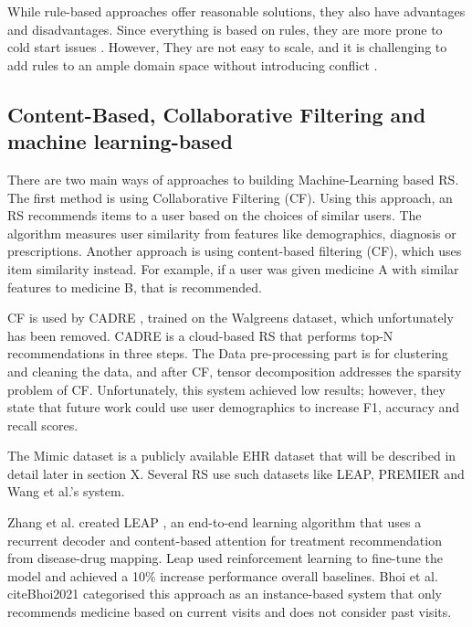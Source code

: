 While rule-based approaches offer reasonable solutions, they also have
advantages and disadvantages. Since everything is based on rules, they are
more prone to cold start issues \cite{PradeepKumarSingh2021}. However, They are
not easy to scale, and it is challenging to add rules to an ample domain space
without introducing conflict \cite{Bhoi2021}.

\subsection{
Content-Based, Collaborative Filtering and machine learning-based
}

There are two main ways of approaches to building Machine-Learning based
RS. The first method is using Collaborative Filtering (CF). Using this
approach, an RS recommends items to a user based on the choices of similar
users. The algorithm measures user similarity from features like
demographics, diagnosis or prescriptions. Another approach is using
content-based filtering (CF), which uses item similarity instead. For
example, if a user was given medicine A with similar features to medicine
B, that is recommended. 


CF is used by CADRE \cite{Zhang2015}, trained on the Walgreens dataset, which unfortunately
has been removed. CADRE is a cloud-based RS that performs top-N
recommendations in three steps. The Data pre-processing part is for
clustering and cleaning the data, and after CF, tensor decomposition
addresses the sparsity problem of CF. Unfortunately, this system achieved
low results; however, they state that future work could use user
demographics to increase F1, accuracy and recall scores.

The Mimic dataset is a publicly available EHR dataset that will be
described in detail later in section X. Several RS use such datasets like
LEAP, PREMIER and Wang et al.'s system. 


Zhang et al. \cite{LEAP} created LEAP , an end-to-end learning algorithm that uses a
recurrent decoder and content-based attention for treatment recommendation from
disease-drug mapping. Leap used reinforcement learning to fine-tune the model
and achieved a 10\% increase performance overall baselines. Bhoi et al. 
cite{Bhoi2021} categorised this approach as an instance-based system that
only recommends medicine based on current visits and does not consider past
visits. 

